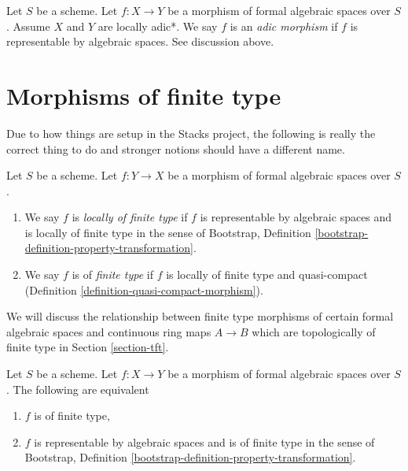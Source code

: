 \begin{definition}
\label{definition-adic-morphism}
Let $S$ be a scheme. Let $f : X \to Y$ be a morphism of formal algebraic
spaces over $S$. Assume $X$ and $Y$ are locally adic*. We say $f$ is
an {\it adic morphism} if $f$ is representable by algebraic spaces.
See discussion above.
\end{definition}











\section{Morphisms of finite type}
\label{section-finite-type}

\noindent
Due to how things are setup in the Stacks project, the following
is really the correct thing to do and stronger notions should have
a different name.

\begin{definition}
\label{definition-finite-type}
Let $S$ be a scheme. Let $f : Y \to X$ be a morphism of formal algebraic
spaces over $S$.
\begin{enumerate}
\item We say $f$ is {\it locally of finite type}
if $f$ is representable by algebraic spaces and is locally
of finite type in the sense of
Bootstrap, Definition \ref{bootstrap-definition-property-transformation}.
\item We say $f$ is of {\it finite type} if $f$ is locally of finite type and
quasi-compact (Definition \ref{definition-quasi-compact-morphism}).
\end{enumerate}
\end{definition}

\noindent
We will discuss the relationship between finite type morphisms of
certain formal algebraic spaces and
continuous ring maps $A \to B$ which are topologically of finite type
in Section \ref{section-tft}.

\begin{lemma}
\label{lemma-characterize-finite-type}
Let $S$ be a scheme. Let $f : X \to Y$ be a morphism of formal algebraic
spaces over $S$. The following are equivalent
\begin{enumerate}
\item $f$ is of finite type,
\item $f$ is representable by algebraic spaces and is of finite type in
the sense of
Bootstrap, Definition \ref{bootstrap-definition-property-transformation}.
\end{enumerate}
\end{lemma}

